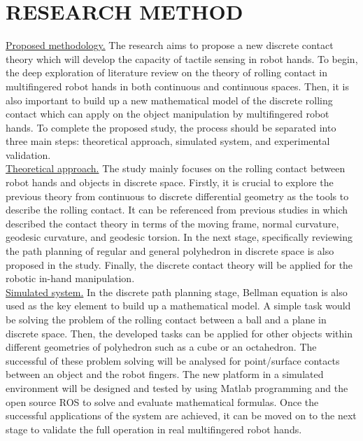 \section{RESEARCH METHOD}
\noindent\uline{Proposed methodology.}
The research aims to propose a new discrete contact theory which will develop the capacity of tactile sensing in robot hands. To begin, the deep exploration of literature review on the theory of rolling contact in multifingered robot hands in both continuous and continuous spaces. Then, it is also important to build up a new mathematical model of the discrete rolling contact which can apply on the object manipulation by multifingered robot hands. To complete the proposed study, the process should be separated into three main steps: theoretical approach, simulated system, and experimental validation.\\

\noindent\uline{Theoretical approach.} The study mainly focuses on the rolling contact between robot hands and objects in discrete space. Firstly, it is crucial to explore the previous theory from continuous to discrete differential geometry as the tools to describe the rolling contact. It can be referenced from previous studies in 
\cite{Lei09_coordinate-free_instantaneous_kinematics, Lei10_Darboux-Frame, Lei15_PolynomialFormulation_InverseKinematics, Lei15_sliding.rolling.loci_kinematics, Lei10_PhDThesis}
which described the contact theory in terms of the moving frame, normal curvature, geodesic curvature, and geodesic torsion. In the next stage, specifically reviewing the path planning of regular and general polyhedron in discrete space is also proposed in the study. Finally, the discrete contact theory will be applied for the robotic in-hand manipulation.\\

\noindent\uline{Simulated system.} In the discrete path planning stage, Bellman equation is also used as the key element to build up a mathematical model. A simple task would be solving the problem of the rolling contact between a ball and a plane in discrete space. Then, the developed tasks can be applied for other objects within different geometries of polyhedron such as a cube or an octahedron. The successful of these problem solving will be analysed for point/surface contacts between an object and the robot fingers. The new platform in a simulated environment will be designed and tested by using Matlab programming and the open source ROS to solve and evaluate mathematical formulas. Once the successful applications of the system are achieved, it can be moved on to the next stage to validate the full operation in real multifingered robot hands.\\

